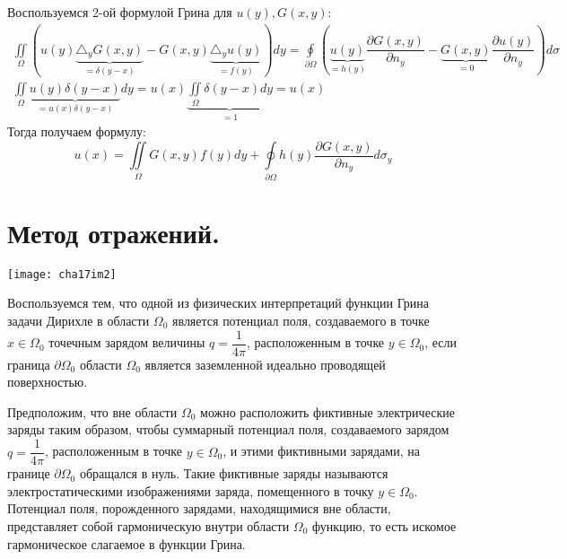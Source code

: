 Воспользуемся 2-ой формулой Грина для $ u(y), G(x, y): $
$$\begin{gathered} 
	\iint\limits_{\Omega}\left(u(y) \underbrace{\triangle_y G(x,y)}_{=\delta (y-x)} - G(x,y)\underbrace{\triangle_y u(y)}_{=f(y)}\right)dy = \oint\limits_{\partial \Omega}\left(\underbrace{u(y)}_{=h(y)}\dfrac{\partial G(x,y)}{\partial n_y} - \underbrace{G(x,y)}_{=0}\dfrac{\partial u(y)}{\partial n_y}\right)d\sigma \\
	\iint\limits_{\Omega}\underbrace{u(y)\delta(y - x)}_{=u(x)\delta(y-x)}dy =  u(x) \underbrace{\iint\limits_{\Omega}\delta(y - x)dy}_{=1} = u(x)
\end{gathered}$$
Тогда получаем формулу:
$$u(x) = \displaystyle \iint\limits_{\Omega} G(x,y)f(y)dy + \oint\limits_{\partial \Omega}h(y)\dfrac{\partial G(x,y)}{\partial n_y}d\sigma_y$$

\section*{Метод отражений.}

\begin{center}
	\texttt{[image: cha17im2]}
\end{center}
	
Воспользуемся тем, что одной из физических интерпретаций функции Грина задачи Дирихле в области $ \Omega_0 $ является потенциал поля, создаваемого в точке $ x \in \Omega_0 $ точечным зарядом величины $ q = \dfrac{1}{4\pi} $, расположенным в точке $ y \in \Omega_0 $, если граница $ \partial \Omega_0 $ области $ \Omega_0 $ является заземленной идеально проводящей поверхностью.

Предположим, что вне области $ \Omega_0 $ можно расположить фиктивные электрические заряды таким образом, чтобы суммарный потенциал поля, создаваемого зарядом $ q = \dfrac{1}{4\pi} $, расположенным в точке $ y \in \Omega_0 $, и этими фиктивными зарядами, на границе $ \partial \Omega_0 $ обращался в нуль. Такие фиктивные заряды называются электростатическими изображениями заряда, помещенного в точку $ y \in \Omega_0 $. Потенциал поля, порожденного зарядами, находящимися вне области, представляет собой гармоническую внутри области $ \Omega_0 $ функцию, то есть искомое гармоническое слагаемое в функции Грина.


